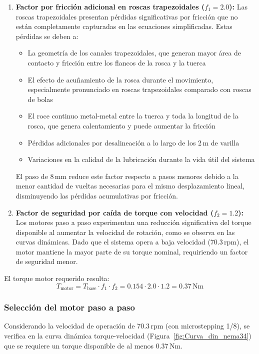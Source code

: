 \begin{enumerate}
    \item \textbf{Factor por fricción adicional en roscas trapezoidales ($f_1 = 2.0$):} Las roscas trapezoidales presentan pérdidas significativas por fricción que no están completamente capturadas en las ecuaciones simplificadas. Estas pérdidas se deben a:
    \begin{itemize}[label=$\bullet$]
        \item La geometría de los canales trapezoidales, que generan mayor área de contacto y fricción entre los flancos de la rosca y la tuerca
        \item El efecto de acuñamiento de la rosca durante el movimiento, especialmente pronunciado en roscas trapezoidales comparado con roscas de bolas
        \item El roce continuo metal-metal entre la tuerca y toda la longitud de la rosca, que genera calentamiento y puede aumentar la fricción
        \item Pérdidas adicionales por desalineación a lo largo de los 2\,m de varilla
        \item Variaciones en la calidad de la lubricación durante la vida útil del sistema
    \end{itemize}
    El paso de 8\,mm reduce este factor respecto a pasos menores debido a la menor cantidad de vueltas necesarias para el mismo desplazamiento lineal, disminuyendo las pérdidas acumulativas por fricción.

    \item \textbf{Factor de seguridad por caída de torque con velocidad ($f_2 = 1.2$):} Los motores paso a paso experimentan una reducción significativa del torque disponible al aumentar la velocidad de rotación, como se observa en las curvas dinámicas. Dado que el sistema opera a baja velocidad (70.3\,rpm), el motor mantiene la mayor parte de su torque nominal, requiriendo un factor de seguridad menor.
\end{enumerate}

El torque motor requerido resulta:
\begin{equation}
T_{\text{motor}} = T_{\text{base}} \cdot f_1 \cdot f_2 = 0.154 \cdot 2.0 \cdot 1.2 = 0.37\,\text{Nm}
\label{eq:torque_motor_vertical}
\end{equation}

\subsubsection{Selección del motor paso a paso}
Considerando la velocidad de operación de 70.3\,rpm (con microstepping 1/8), se verifica en la curva dinámica torque-velocidad (Figura~\ref{fig:Curva_din_nema34}) que se requiere un torque disponible de al menos 0.37\,Nm.

